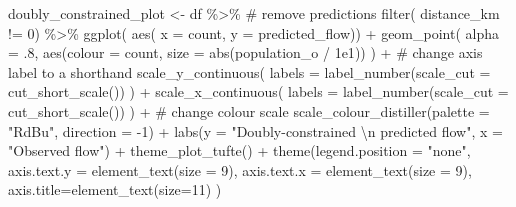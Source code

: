 \documentclass[
  a4paper, 
  twoside,
  final
]{article}
\newenvironment{Shaded}{\begin{snugshade}}{\end{snugshade}}
\newcommand{\AttributeTok}[1]{\textcolor[rgb]{0.40,0.45,0.13}{#1}}
\newcommand{\CommentTok}[1]{\textcolor[rgb]{0.37,0.37,0.37}{#1}}
\newcommand{\DecValTok}[1]{\textcolor[rgb]{0.68,0.00,0.00}{#1}}
\newcommand{\FloatTok}[1]{\textcolor[rgb]{0.68,0.00,0.00}{#1}}
\newcommand{\FunctionTok}[1]{\textcolor[rgb]{0.28,0.35,0.67}{#1}}
\newcommand{\NormalTok}[1]{\textcolor[rgb]{0.00,0.23,0.31}{#1}}
\newcommand{\OtherTok}[1]{\textcolor[rgb]{0.00,0.23,0.31}{#1}}
\newcommand{\SpecialCharTok}[1]{\textcolor[rgb]{0.37,0.37,0.37}{#1}}
\newcommand{\StringTok}[1]{\textcolor[rgb]{0.13,0.47,0.30}{#1}}
\begin{document}
\begin{Shaded}
\begin{Highlighting}[]
\NormalTok{doubly\_constrained\_plot }\OtherTok{\textless{}{-}}\NormalTok{ df }\SpecialCharTok{\%\textgreater{}\%} 
  \CommentTok{\# remove predictions}
  \FunctionTok{filter}\NormalTok{( distance\_km }\SpecialCharTok{!=} \DecValTok{0}\NormalTok{) }\SpecialCharTok{\%\textgreater{}\%} 
  \FunctionTok{ggplot}\NormalTok{( }\FunctionTok{aes}\NormalTok{( }\AttributeTok{x =}\NormalTok{ count, }\AttributeTok{y =}\NormalTok{ predicted\_flow)) }\SpecialCharTok{+}
  \FunctionTok{geom\_point}\NormalTok{( }\AttributeTok{alpha =}\NormalTok{ .}\DecValTok{8}\NormalTok{, }\FunctionTok{aes}\NormalTok{(}\AttributeTok{colour =}\NormalTok{ count, }
                              \AttributeTok{size =} \FunctionTok{abs}\NormalTok{(population\_o }\SpecialCharTok{/} \FloatTok{1e1}\NormalTok{)) ) }\SpecialCharTok{+}
  \CommentTok{\# change axis label to a shorthand}
  \FunctionTok{scale\_y\_continuous}\NormalTok{(}
    \AttributeTok{labels =} \FunctionTok{label\_number}\NormalTok{(}\AttributeTok{scale\_cut =} \FunctionTok{cut\_short\_scale}\NormalTok{())}
\NormalTok{    ) }\SpecialCharTok{+} 
  \FunctionTok{scale\_x\_continuous}\NormalTok{(}
    \AttributeTok{labels =} \FunctionTok{label\_number}\NormalTok{(}\AttributeTok{scale\_cut =} \FunctionTok{cut\_short\_scale}\NormalTok{())}
\NormalTok{    ) }\SpecialCharTok{+} 
  \CommentTok{\# change colour scale}
  \FunctionTok{scale\_colour\_distiller}\NormalTok{(}\AttributeTok{palette =} \StringTok{"RdBu"}\NormalTok{, }\AttributeTok{direction =} \SpecialCharTok{{-}}\DecValTok{1}\NormalTok{) }\SpecialCharTok{+}
  \FunctionTok{labs}\NormalTok{(}\AttributeTok{y =} \StringTok{"Doubly{-}constrained }\SpecialCharTok{\textbackslash{}n}\StringTok{ predicted flow"}\NormalTok{,}
       \AttributeTok{x =} \StringTok{"Observed flow"}\NormalTok{) }\SpecialCharTok{+}
  \FunctionTok{theme\_plot\_tufte}\NormalTok{() }\SpecialCharTok{+}
  \FunctionTok{theme}\NormalTok{(}\AttributeTok{legend.position =} \StringTok{"none"}\NormalTok{,}
        \AttributeTok{axis.text.y =} \FunctionTok{element\_text}\NormalTok{(}\AttributeTok{size =} \DecValTok{9}\NormalTok{),}
        \AttributeTok{axis.text.x =} \FunctionTok{element\_text}\NormalTok{(}\AttributeTok{size =} \DecValTok{9}\NormalTok{),}
        \AttributeTok{axis.title=}\FunctionTok{element\_text}\NormalTok{(}\AttributeTok{size=}\DecValTok{11}\NormalTok{)}
\NormalTok{        )}
\end{Highlighting}
\end{Shaded}
\end{document}
